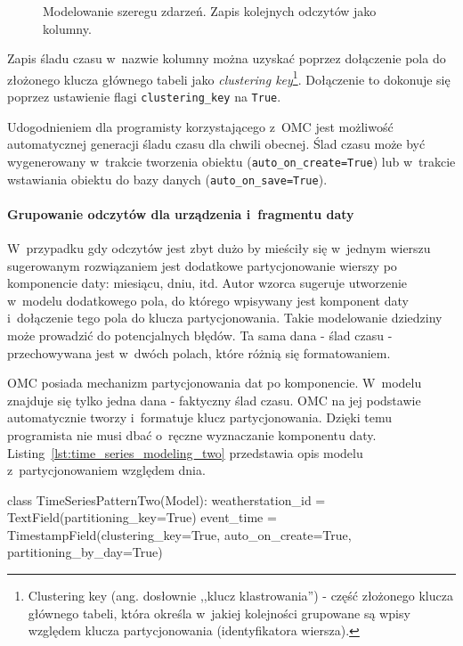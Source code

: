 \begin{figure}[ht!]
	\centering
	\theverbbox
	\caption{Modelowanie szeregu zdarzeń. Zapis kolejnych odczytów jako kolumny.}
	\label{lst:time_series_modeling_one}
\end{figure}

Zapis śladu czasu w~nazwie kolumny można uzyskać poprzez dołączenie pola do złożonego klucza głównego tabeli jako \emph{clustering key}\footnote{Clustering key (ang. dosłownie ,,klucz klastrowania'') - część złożonego klucza głównego tabeli, która określa w~jakiej kolejności grupowane są wpisy względem klucza partycjonowania (identyfikatora wiersza).}. Dołączenie to dokonuje się poprzez ustawienie flagi \verb+clustering_key+ na \verb+True+. 

Udogodnieniem dla programisty korzystającego z~OMC jest możliwość automatycznej generacji śladu czasu dla chwili obecnej. Ślad czasu może być wygenerowany w~trakcie tworzenia obiektu (\verb+auto_on_create=True+) lub w~trakcie wstawiania obiektu do bazy danych (\verb+auto_on_save=True+).  

\paragraph{Grupowanie odczytów dla urządzenia i~fragmentu daty} 

W~przypadku gdy odczytów jest zbyt dużo by mieściły się w~jednym wierszu sugerowanym rozwiązaniem jest dodatkowe partycjonowanie wierszy po komponencie daty: miesiącu, dniu, itd. Autor wzorca sugeruje utworzenie w~modelu dodatkowego pola, do którego wpisywany jest komponent daty i~dołączenie tego pola do klucza partycjonowania. Takie modelowanie dziedziny może prowadzić do potencjalnych błędów. Ta sama dana - ślad czasu - przechowywana jest w~dwóch polach, które różnią się formatowaniem. 

OMC posiada mechanizm partycjonowania dat po komponencie. W~modelu znajduje się tylko jedna dana - faktyczny ślad czasu. OMC na jej podstawie automatycznie tworzy i~formatuje klucz partycjonowania. Dzięki temu programista nie musi dbać o~ręczne wyznaczanie komponentu daty. Listing~\ref{lst:time_series_modeling_two} przedstawia opis modelu z~partycjonowaniem względem dnia.

\begin{verbbox}
class TimeSeriesPatternTwo(Model):
    weatherstation_id = TextField(partitioning_key=True)
    event_time = TimestampField(clustering_key=True, 
                                auto_on_create=True, 
                                partitioning_by_day=True)
\end{verbbox}

